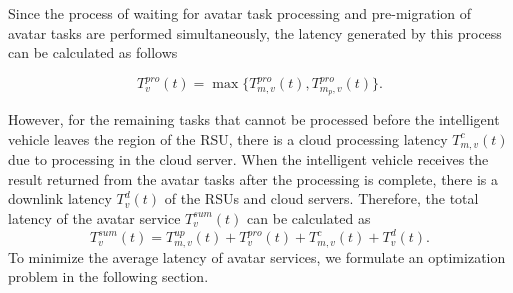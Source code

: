 \documentclass[lettersize,journal]{IEEEtran}
\begin{document}
Since the process of waiting for avatar task processing and pre-migration of avatar tasks are performed simultaneously, the latency generated by this process can be calculated as follows

\begin{equation}
T^{pro}_{v}(t)= \max \{T^{pro}_{m,v}(t),T^{pro}_{m_{p},v}(t) \}.\label{eq11}
\end{equation}

However, for the remaining tasks that cannot be processed before the intelligent vehicle leaves the region of the RSU, there is a cloud processing latency $T^{c}_{m,v}(t)$ due to processing in the cloud server. When the intelligent vehicle receives the result returned from the avatar tasks after the processing is complete, there is a downlink latency $T^{d}_{v}(t)$ of the RSUs and cloud servers.
Therefore, the total latency of the avatar service $T^{sum}_v(t)$ can be calculated as
\begin{equation}
T^{sum}_v(t)=T^{up}_{m,v}(t)+T^{pro}_{v}(t)+T^{c}_{m,v}(t)+T^{d}_{v}(t).\label{eq18}
\end{equation}
To minimize the average latency of avatar services, we formulate an optimization problem in the following section.
\end{document}
